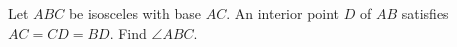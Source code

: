 Let $ABC$ be isosceles with base $AC$. An interior point $D$ of $AB$ satisfies $AC=CD=BD$. Find $\angle ABC$.

